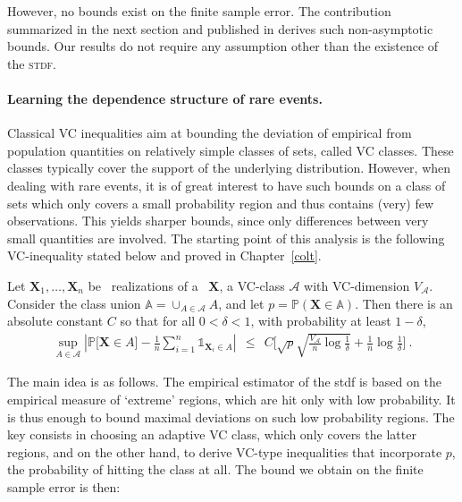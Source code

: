However, no bounds exist on the finite sample error. The contribution summarized in the next section and published in \cite{COLT15} derives such non-asymptotic bounds. Our results do not require any assumption other than the existence of the \textsc{stdf}. 




\paragraph{Learning the dependence structure of rare events.}
Classical VC inequalities aim at bounding the deviation of empirical from population quantities on relatively simple classes of sets, called VC classes. These classes typically cover the support of the underlying distribution.  However, when dealing with rare events, it is of great interest to have such bounds on a class of sets which only covers a small probability region and thus contains (very) few observations. This yields sharper bounds, since only differences  between very small quantities are involved. The starting point of this analysis is the following VC-inequality stated below and proved in Chapter~\ref{colt}.
\begin{theorem}
\label{thm-princ} 
Let $\mathbf{X}_1,\ldots,\mathbf{X}_n$ be \iid~realizations of a \rv~$\mathbf{X}$, a VC-class $\mathcal{A}$ with VC-dimension $V_{\mathcal{A}}$. %
Consider the class union $\mathbb{A} = \cup_{A \in \mathcal{A}} A$,
 and let  
$p = \mathbb{P}(\mathbf{X} \in \mathbb{A})$. Then there is an absolute constant $C$ so that for all $0<\delta<1$, with probability at least $1-\delta$,
\begin{align*}
\sup_{A \in \mathcal{A}} \left| \mathbb{P} \big[\mathbf{X} \in A\big] - \frac{1}{n} \sum_{i=1}^n \mathds{1}_{\mathbf{X}_i \in A}  \right| ~~\le~~ C \bigg[ \sqrt{p}\sqrt{\frac{V_{\mathcal{A}}}{n} \log{\frac{1}{\delta}}} + \frac{1}{n} \log{\frac{1}{\delta}} \bigg]~.
\end{align*}
\end{theorem}


The main idea is as follows. The empirical estimator of the {\sc stdf} is based on the empirical measure of `extreme' regions, which  are hit only with  low probability. It is thus enough to bound  maximal deviations on such low probability regions. 
 The key consists in choosing an adaptive VC class, which only covers the latter regions, and on the other hand, to derive VC-type inequalities that incorporate $p$, the probability of hitting the class at all. The bound we obtain on the finite sample error is then:

